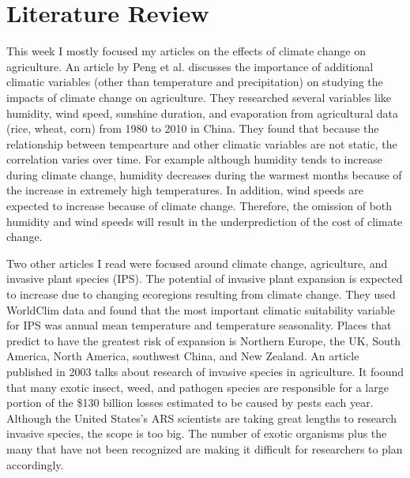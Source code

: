 \documentclass[a4paper,10pt]{article}
\begin{document}
\section{Literature Review}
This week I mostly focused my articles on the effects of climate change on agriculture. An article by Peng et al. 
discusses the importance of additional climatic variables (other than temperature and precipitation) on studying 
the impacts of climate change on agriculture. They researched several variables like humidity, wind speed, sunshine 
duration, and evaporation from agricultural data (rice, wheat, corn) from 1980 to 2010 in China. They found that 
because the relationship between tempearture and other climatic variables are not static, the correlation varies 
over time. For example although humidity tends to increase during climate change, humidity decreases during the 
warmest months because of the increase in extremely high temperatures. In addition, wind speeds are expected to 
increase because of climate change. Therefore, the omission of both humidity and wind speeds will result in the 
underprediction of the cost of climate change. \cite{peng2017economic}

Two other articles I read were focused around climate change, agriculture, and invasive plant species (IPS). The 
potential of invasive plant expansion is expected to increase due to changing ecoregions resulting from climate 
change. They used WorldClim data and found that the most important climatic suitability variable for IPS was 
annual mean temperature and temperature seasonality. Places that predict to have the greatest risk of expansion 
is Northern Europe, the UK, South America, North America, southwest China, and New Zealand.  \cite{wang2019potential} 
An article published in 2003 talks about research of invasive species in agriculture. It foound that many exotic insect, weed, and 
pathogen species are responsible for a large portion of the \$130 billion losses estimated to be caused by pests 
each year. Although the United States's ARS scientists are taking great lengths to research invasive species, the 
scope is too big. The number of exotic organisms plus the many that have not been recognized are making it difficult 
for researchers to plan accordingly. \cite{carruthers2003invasive}





\end{document}
